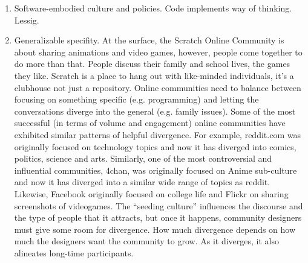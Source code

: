 \begin{enumerate}
\item Software-embodied culture and policies.
Code implements way of thinking.
Lessig.
\item Generalizable specifity.
At the surface, the Scratch Online Community is about sharing animations and video games, however, people come together to do more than that. 
People discuss their family and school lives, the games they like.
Scratch is a place to hang out with like-minded individuals, it's a clubhouse not just a repository.
Online communities need to balance between focusing on something specific (e.g. programming) and letting the conversations diverge into the general (e.g. family issues).
Some of the most successful (in terms of volume and engagement) online communities have exhibited similar patterns of helpful divergence.
For example, reddit.com was originally focused on technology topics and now it has diverged into comics, politics, science and arts.
Similarly, one of the most controversial and influential communities, 4chan, was originally focused on Anime sub-culture and now it has diverged into a similar wide range of topics as reddit.
Likewise, Facebook originally focused on college life and Flickr on sharing screenshots of videogames.
The ``seeding culture'' influences the discourse and the type of people that it attracts, but once it happens, community designers must give some room for divergence. 
How much divergence depends on how much the designers want the community to grow.
As it diverges, it also alineates long-time participants.

\end{enumerate}
